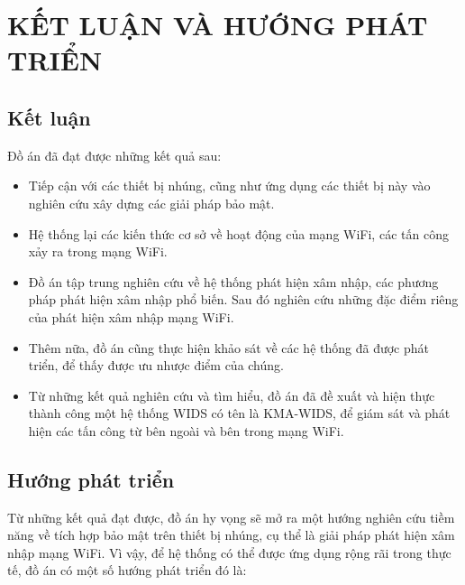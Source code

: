 \chapter{KẾT LUẬN VÀ HƯỚNG PHÁT TRIỂN}
\ifpdf
    \graphicspath{{Conclusions/ConclusionsFigs/PNG/}{Conclusions/ConclusionsFigs/PDF/}{Conclusions/ConclusionsFigs/}}
\else
    \graphicspath{{Conclusions/ConclusionsFigs/EPS/}{Conclusions/ConclusionsFigs/}}
\fi

\renewcommand{\baselinestretch}{1.3}

\section{Kết luận}
Đồ án đã đạt được những kết quả sau:

\begin{itemize}
\item Tiếp cận với các thiết bị nhúng, cũng như ứng dụng các thiết bị này vào nghiên cứu xây dựng các giải pháp bảo mật.
\item Hệ thống lại các kiến thức cơ sở về hoạt động của mạng WiFi, các tấn công xảy ra trong mạng WiFi.
\item Đồ án tập trung nghiên cứu về hệ thống phát hiện xâm nhập, các phương pháp phát hiện xâm nhập phổ biến. Sau đó nghiên cứu những đặc điểm riêng của phát hiện xâm nhập mạng WiFi.
\item Thêm nữa, đồ án cũng thực hiện khảo sát về các hệ thống đã được phát triển, để thấy được ưu nhược điểm của chúng.
\item Từ những kết quả nghiên cứu và tìm hiểu, đồ án đã đề xuất và hiện thực thành công một hệ thống WIDS có tên là KMA-WIDS, để giám sát và phát hiện các tấn công từ bên ngoài và bên trong mạng WiFi.
\end{itemize}

\section{Hướng phát triển} \label{section:huong-phat-trien}

Từ những kết quả đạt được, đồ án hy vọng sẽ mở ra một hướng nghiên cứu tiềm năng về tích hợp bảo mật trên thiết bị nhúng, cụ thể là giải pháp phát hiện xâm nhập mạng WiFi. Vì vậy, để hệ thống có thể được ứng dụng rộng rãi trong thực tế, đồ án có một số hướng phát triển đó là:

